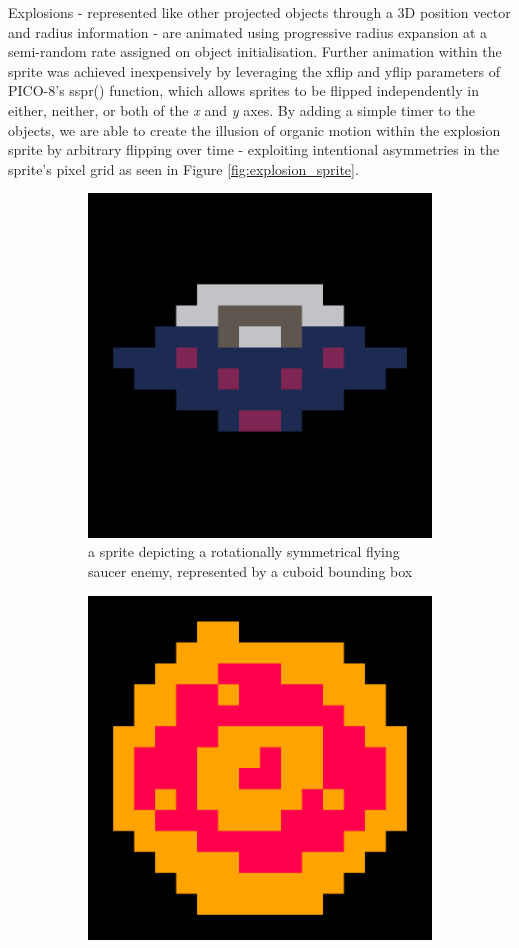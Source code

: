 \documentclass[11pt]{article}
\begin{document}
Explosions - represented like other projected objects through a 3D position vector and radius information -
are animated using progressive radius expansion at a semi-random rate assigned on object initialisation.
Further animation within the sprite was achieved inexpensively by leveraging the xflip and yflip parameters
of PICO-8's sspr() function, which allows sprites to be flipped independently in either, neither, or both of the
\textit{x} and \textit{y} axes. By adding a simple timer to the objects, we are able to create the illusion of
organic motion within the explosion sprite by arbitrary flipping over time - exploiting intentional asymmetries
in the sprite's pixel grid as seen in Figure \ref{fig:explosion_sprite}.

\begin{figure}[h]
\begin{subfigure}{.45\textwidth}
  \centering
  \includegraphics[width=.8\linewidth]{ship_sprite}
  \caption{a sprite depicting a rotationally symmetrical flying saucer enemy, represented by a cuboid
  bounding box}
  \label{fig:saucer}
\end{subfigure}\hfill
\begin{subfigure}{.45\textwidth}
  \centering
  \includegraphics[width=.8\linewidth]{explosion_sprite}

\end{subfigure}
\end{figure}
\end{document}
